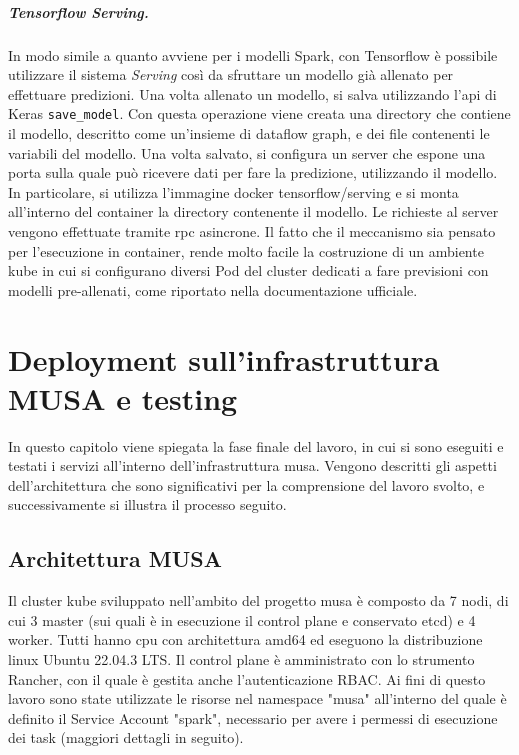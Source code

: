 \documentclass[12pt,a4paper,fleqn,titlepage]{report}
\begin{document}
        \paragraph{Tensorflow Serving.}
        In modo simile a quanto avviene per i modelli Spark, con Tensorflow è possibile utilizzare il sistema \emph{Serving} così da sfruttare un modello già allenato per effettuare predizioni. Una volta allenato un modello, si salva utilizzando l'\gls{api} di Keras \lstinline{save_model}. Con questa operazione viene creata una directory che contiene il modello, descritto come un'insieme di dataflow graph, e dei file contenenti le variabili del modello. Una volta salvato, si configura un server che espone una porta sulla quale può ricevere dati per fare la predizione, utilizzando il modello. In particolare, si utilizza l'immagine \gls{docker} tensorflow/serving e si monta all'interno del \gls{container} la directory contenente il modello. Le richieste al server vengono effettuate tramite \gls{rpc} asincrone. Il fatto che il meccanismo sia pensato per l'esecuzione in \gls{container}, rende molto facile la costruzione di un ambiente \gls{kube} in cui si configurano diversi Pod del \gls{cluster} dedicati a fare previsioni con modelli pre-allenati, come riportato nella documentazione ufficiale.

\chapter{Deployment sull'infrastruttura MUSA e testing}\label{ch:musa}
    In questo capitolo viene spiegata la fase finale del lavoro, in cui si sono eseguiti e testati i servizi all'interno dell'infrastruttura \gls{musa}. Vengono descritti gli aspetti dell'architettura che sono significativi per la comprensione del lavoro svolto, e successivamente si illustra il processo seguito.

    \section{Architettura MUSA}
        Il \gls{cluster} \gls{kube} sviluppato nell'ambito del progetto \gls{musa} è composto da 7 nodi, di cui 3 master (sui quali è in esecuzione il control plane e conservato etcd) e 4 worker. Tutti hanno \gls{cpu} con architettura amd64 ed eseguono la distribuzione linux Ubuntu 22.04.3 LTS. Il control plane è amministrato con lo strumento Rancher, con il quale è gestita anche l'autenticazione RBAC. Ai fini di questo lavoro sono state utilizzate le risorse nel namespace "musa" all'interno del quale è definito il Service Account "spark", necessario per avere i permessi di esecuzione dei task (maggiori dettagli in seguito).
\end{document}
